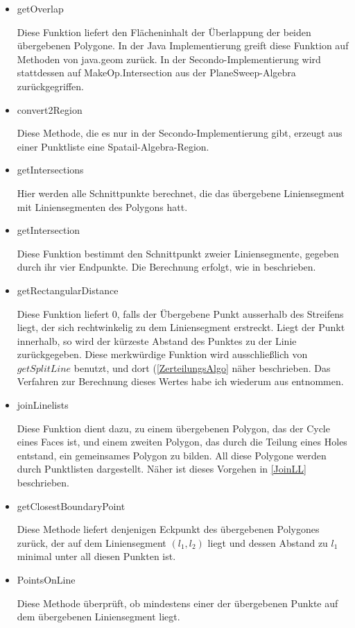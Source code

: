 \begin{itemize}
\item getOverlap

Diese Funktion liefert den Flächeninhalt der Überlappung der beiden übergebenen Polygone. In der Java Implementierung greift diese Funktion auf Methoden von java.geom zurück. In der Secondo-Implementierung wird stattdessen auf MakeOp.Intersection aus der PlaneSweep-Algebra zurückgegriffen.

\item convert2Region

Diese Methode, die es nur in der Secondo-Implementierung gibt, erzeugt aus einer Punktliste eine Spatail-Algebra-Region.

\item getIntersections

Hier werden alle Schnittpunkte berechnet, die das übergebene Liniensegment mit Liniensegmenten des Polygons hatt. 

\item getIntersection

Diese Funktion bestimmt den Schnittpunkt zweier Liniensegmente, gegeben durch ihr vier Endpunkte. Die Berechnung erfolgt, wie in \cite{BW} beschrieben.

\item getRectangularDistance

Diese Funktion liefert 0, falls der Übergebene Punkt ausserhalb des Streifens liegt, der sich rechtwinkelig zu dem Liniensegment erstreckt. Liegt der Punkt innerhalb, so wird der kürzeste Abstand des Punktes zu der Linie zurückgegeben. Diese merkwürdige Funktion wird ausschließlich von $getSplitLine$ benutzt, und dort (\ref{ZerteilungsAlgo} näher beschrieben. Das Verfahren zur Berechnung dieses Wertes habe ich wiederum aus \cite{BW} entnommen.

\item joinLinelists

Diese Funktion dient dazu, zu einem übergebenen Polygon, das der Cycle eines Faces ist, und einem zweiten Polygon, das durch die Teilung eines Holes entstand, ein gemeinsames Polygon zu bilden. All diese  Polygone werden durch Punktlisten dargestellt. Näher ist dieses Vorgehen in \ref{JoinLL} beschrieben.

\item getClosestBoundaryPoint

Diese Methode liefert denjenigen Eckpunkt des übergebenen Polygones zurück, der auf dem Liniensegment $(l_1,l_2)$ liegt und dessen Abstand zu $l_1$ minimal unter all diesen Punkten ist.

\item PointsOnLine

Diese Methode überprüft, ob mindestens einer der übergebenen Punkte auf dem übergebenen Liniensegment liegt.

\end{itemize}



